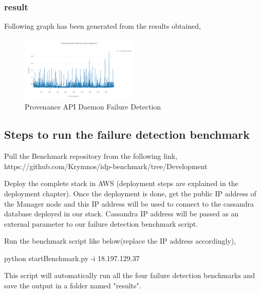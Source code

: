 \subsubsection{result}

Following graph has been generated from the results obtained,

\begin{figure}[H]
	\center
	\includegraphics[width=0.5\textwidth]{figures/benchmark_provenance.png}
	\caption{Provenance API Daemon Failure Detection}
	\label{fig:benchmark_provenance}
\end{figure}


\subsection{Steps to run the failure detection benchmark}


Pull the Benchmark repository from the following link,
https://github.com/Krymnos/idp-benchmark/tree/Development

Deploy the complete stack in AWS (deployment steps are explained in the deployment chapter). Once the deployment is done, get the public IP address of the Manager node and this IP address will be used to connect to the cassandra database deployed in our stack. Cassandra IP address will be passed as an external parameter to our failure detection benchmark script.

Run the benchmark script like below(replace the IP address accordingly),

\begin{center}
    python startBenchmark.py -i 18.197.129.37
\end{center}

This script will automatically run all the four failure detection benchmarks and save the output in a folder named "results".


